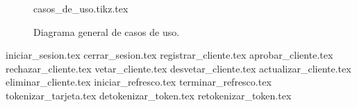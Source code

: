 \begin{table}
  \caption{Relación de casos de uso y requerimientos}
  \label{casos_de_uso_vs_requerimientos}
\end{table}


\begin{sidewaysfigure}
  \begin{center}
    {casos_de_uso.tikz.tex}
    \caption{Diagrama general de casos de uso.}
    \label{casos_de_uso_general}
  \end{center}
\end{sidewaysfigure}

{iniciar_sesion.tex}
{cerrar_sesion.tex}
{registrar_cliente.tex}
{aprobar_cliente.tex}
{rechazar_cliente.tex}
{vetar_cliente.tex}
{desvetar_cliente.tex}
{actualizar_cliente.tex}
{eliminar_cliente.tex}
{iniciar_refresco.tex}
{terminar_refresco.tex}
{tokenizar_tarjeta.tex}
{detokenizar_token.tex}
{retokenizar_token.tex}

